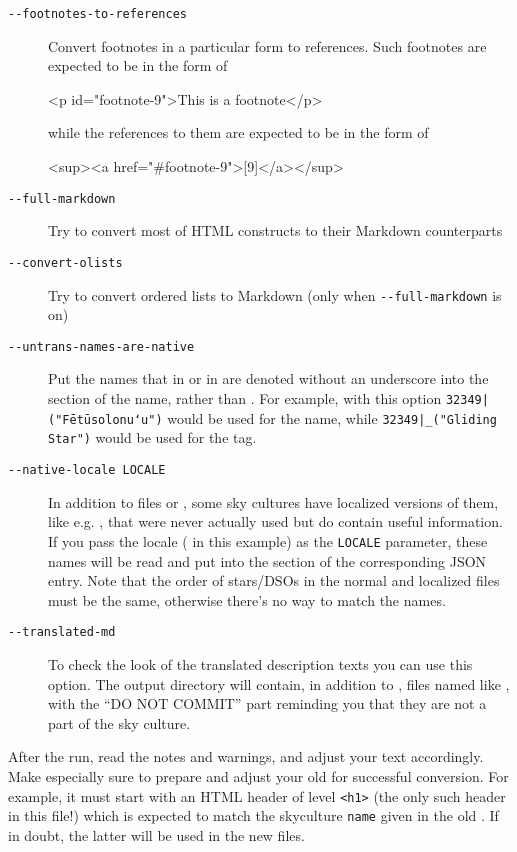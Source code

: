 \begin{description}
\item[\texttt{-\/-footnotes-to-references}] Convert footnotes in a particular form to references. Such footnotes are expected to be in the form of
\begin{htmlbit}
<p id="footnote-9">This is a footnote</p>
\end{htmlbit}
while the references to them are expected to be in the form of
\begin{htmlbit}
<sup><a href="#footnote-9">[9]</a></sup>
\end{htmlbit}
\item[\texttt{-\/-full-markdown}] Try to convert most of HTML constructs to their Markdown counterparts
\item[\texttt{-\/-convert-olists}] Try to convert ordered lists to Markdown (only when \texttt{-\/-full-markdown} is on)
\item[\texttt{-\/-untrans-names-are-native}] Put the names that in  or in 
       are denoted without an underscore into the  section of the name, 
      rather than . For example, with this option \texttt{32349|("Fētūsolonuʻu")} would be 
      used for the  name, while \texttt{32349|\_("Gliding Star")} would be used for the  tag.
\item[\texttt{-\/-native-locale LOCALE}] In addition to files  or , 
      some sky cultures have localized versions of them, like e.g. , 
      that were never actually used but do contain useful information. If you pass the locale ( in this example) 
      as the \texttt{LOCALE} parameter, these names will be read and put into the  section of the corresponding JSON entry. 
      Note that the order of stars/DSOs in the normal and localized files must be the same, otherwise there's no way to match the names.
\item[\texttt{-\/-translated-md}] To check the look of the translated description texts you can use this option. 
      The output directory will contain, in addition to , files named like 
      , with the ``DO NOT COMMIT'' part reminding you that they are not a part of the sky culture.
\end{description}

\noindent After the run, read the notes and warnings, and adjust your text accordingly. 
Make especially sure to prepare and adjust your old  for successful conversion.
For example, it must start with an HTML header of level \texttt{<h1>} (the only such header in this file!) which is expected 
to match the skyculture \texttt{name} given in the old . If in doubt, the latter will be used in the new files.

